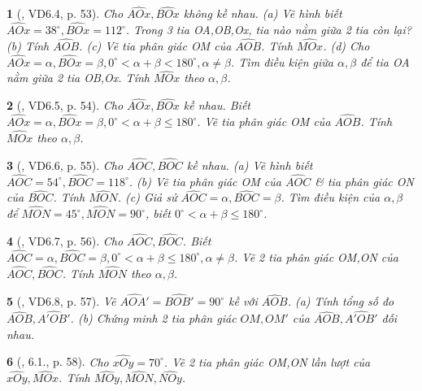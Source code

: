 \documentclass{article}
\newtheorem{baitoan}{}
\begin{document}
\begin{baitoan}[\cite{TLCT_THCS_Toan_6_hinh_hoc}, VD6.4, p. 53]
	Cho $\widehat{AOx},\widehat{BOx}$ không kề nhau. (a) Vẽ hình biết $\widehat{AOx} = 38^\circ,\widehat{BOx} = 112^\circ$. Trong 3 tia OA,OB,Ox, tia nào nằm giữa 2 tia còn lại? (b) Tính $\widehat{AOB}$. (c) Vẽ tia phân giác OM của $\widehat{AOB}$. Tính $\widehat{MOx}$. (d) Cho $\widehat{AOx} = \alpha,\widehat{BOx} = \beta,0^\circ < \alpha + \beta < 180^\circ,\alpha\ne\beta$. Tìm điều kiện giữa $\alpha,\beta$ để tia OA nằm giữa 2 tia OB,Ox. Tính $\widehat{MOx}$ theo $\alpha,\beta$.
\end{baitoan}

\begin{baitoan}[\cite{TLCT_THCS_Toan_6_hinh_hoc}, VD6.5, p. 54]
	Cho $\widehat{AOx},\widehat{BOx}$ kề nhau. Biết $\widehat{AOx} = \alpha,\widehat{BOx} = \beta,0^\circ < \alpha + \beta\le180^\circ$. Vẽ tia phân giác OM của $\widehat{AOB}$. Tính $\widehat{MOx}$ theo $\alpha,\beta$.
\end{baitoan}

\begin{baitoan}[\cite{TLCT_THCS_Toan_6_hinh_hoc}, VD6.6, p. 55]
	Cho $\widehat{AOC},\widehat{BOC}$ kề nhau. (a) Vẽ hình biết $\widehat{AOC} = 54^\circ,\widehat{BOC} = 118^\circ$. (b) Vẽ tia phân giác OM của $\widehat{AOC}$ \& tia phân giác ON của $\widehat{BOC}$. Tính $\widehat{MON}$. (c) Giả sử $\widehat{AOC} = \alpha,\widehat{BOC} = \beta$. Tìm điều kiện của $\alpha,\beta$ để $\widehat{MON} = 45^\circ,\widehat{MON} = 90^\circ$, biết $0^\circ < \alpha + \beta\le180^\circ$.
\end{baitoan}

\begin{baitoan}[\cite{TLCT_THCS_Toan_6_hinh_hoc}, VD6.7, p. 56]
	Cho $\widehat{AOC},\widehat{BOC}$. Biết $\widehat{AOC} = \alpha,\widehat{BOC} = \beta,0^\circ < \alpha + \beta\le180^\circ,\alpha\ne\beta$. Vẽ 2 tia phân giác OM,ON của $\widehat{AOC},\widehat{BOC}$. Tính $\widehat{MON}$ theo $\alpha,\beta$.
\end{baitoan}

\begin{baitoan}[\cite{TLCT_THCS_Toan_6_hinh_hoc}, VD6.8, p. 57]
	Vẽ $\widehat{AOA'} = \widehat{BOB'} = 90^\circ$ kề với $\widehat{AOB}$. (a) Tính tổng số đo $\widehat{AOB},\widehat{A'OB'}$. (b) Chứng minh 2 tia phân giác $OM,OM'$ của $\widehat{AOB},\widehat{A'OB'}$ đối nhau.
\end{baitoan}

\begin{baitoan}[\cite{TLCT_THCS_Toan_6_hinh_hoc}, 6.1., p. 58]
	Cho $\widehat{xOy} = 70^\circ$. Vẽ 2 tia phân giác OM,ON lần lượt của $\widehat{xOy},\widehat{MOx}$. Tính $\widehat{MOy},\widehat{MON},\widehat{NOy}$.
\end{baitoan}
\end{document}
